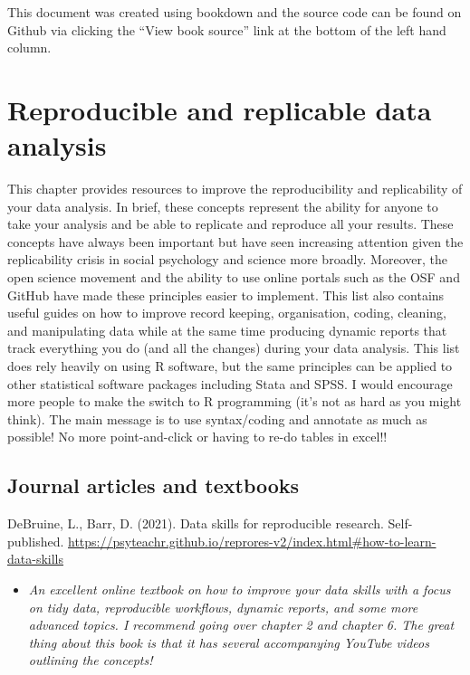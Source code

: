 \documentclass[
]{book}
\providecommand{\tightlist}{%
  \setlength{\itemsep}{0pt}\setlength{\parskip}{0pt}}
\begin{document}
This document was created using bookdown and the source code can be found on Github via clicking the ``View book source'' link at the bottom of the left hand column.

\chapter{Reproducible and replicable data analysis}\label{reproducible-and-replicable-data-analysis}

This chapter provides resources to improve the reproducibility and replicability of your data analysis. In brief, these concepts represent the ability for anyone to take your analysis and be able to replicate and reproduce all your results. These concepts have always been important but have seen increasing attention given the replicability crisis in social psychology and science more broadly. Moreover, the open science movement and the ability to use online portals such as the OSF and GitHub have made these principles easier to implement. This list also contains useful guides on how to improve record keeping, organisation, coding, cleaning, and manipulating data while at the same time producing dynamic reports that track everything you do (and all the changes) during your data analysis. This list does rely heavily on using R software, but the same principles can be applied to other statistical software packages including Stata and SPSS. I would encourage more people to make the switch to R programming (it's not as hard as you might think). The main message is to use syntax/coding and annotate as much as possible! No more point-and-click or having to re-do tables in excel!!

\section{Journal articles and textbooks}\label{journal-articles-and-textbooks}

DeBruine, L., Barr, D. (2021). Data skills for reproducible research. Self-published. \url{https://psyteachr.github.io/reprores-v2/index.html\#how-to-learn-data-skills}

\begin{itemize}
\tightlist
\item
  \emph{An excellent online textbook on how to improve your data skills with a focus on tidy data, reproducible workflows, dynamic reports, and some more advanced topics. I recommend going over chapter 2 and chapter 6. The great thing about this book is that it has several accompanying YouTube videos outlining the concepts!}
\end{itemize}
\end{document}
